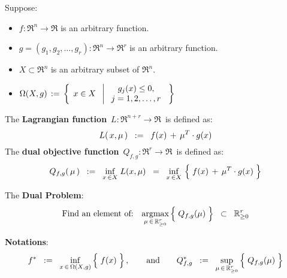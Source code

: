 \noindent
\begin{definition}
\mbox{}
\vskip 0.1cm
\noindent
Suppose:
\begin{itemize}
\item
	$f : \Re^{n} \longrightarrow \Re$ is an arbitrary function.
\item
	$g = (g_{1},g_{2},\ldots,g_{r}) : \Re^{n} \longrightarrow \Re^{r}$ is an arbitrary function.
\item
	$X \subset \Re^{n}$ is an arbitrary subset of $\Re^{n}$.
\item
	$\Omega(X,g) \, := \,
	\left\{\;\,
	x \overset{{\color{white}.}}{\in} X
	\;\;\left\vert\;
		\begin{array}{c}
			g_{j}(x) \leq 0,
			\\
			j = 1,2,\ldots,r
		\end{array}
		\right.
	\;\right\}$
\end{itemize}
The \textbf{Lagrangian function} \,$L : \Re^{n+r} \longrightarrow \Re$\, is defined as:
\begin{equation*}
L(\,x,\mu\,)
\;\; := \;\;
	f(x) \,\overset{{\color{white}.}}{+}\, \mu^{T}\cdot g(x)
\end{equation*}
The \textbf{dual objective function} \,$Q_{f,g} : \Re^{r} \longrightarrow \Re$\, is defined as:
\begin{equation*}
Q_{f,g}(\,\mu\,)
\;\; := \;\;
	\underset{x\,\in X}{\inf}\;L(x,\mu)
\;\; = \;\;
	\underset{x\,\in X}{\inf}\,\left\{\;f(x) \,\overset{{\color{white}.}}{+}\, \mu^{T}\cdot g(x)\;\right\}
\end{equation*}

\vskip 0.5cm
\noindent
The \textbf{Dual Problem}:
\begin{equation*}
\textnormal{Find an element of:}
\quad
	\underset{\mu\,\in\,\Re_{\geq 0}^{r}}{\argmax}\left\{\;
	\overset{{\color{white}.}}{Q_{f,g}(\mu)}
	\;\right\}
\;\; \subset \;\;
	\Re^{r}_{\geq 0}
\end{equation*}

\vskip 0.5cm
\noindent
\textbf{Notations}:
\begin{equation*}
f^{*}
\;\; := \;\;
	\underset{x\,\in\,\Omega(X,g)}{\inf}\left\{\;
		\overset{{\color{white}.}}{f(x)}
		\;\right\},
\quad\quad
\textnormal{and}
\quad\quad
Q_{f,g}^{*}
\;\; := \;\;
	\underset{\mu\,\in\,\Re_{\geq 0}^{r}}{\sup}\left\{\;
	\overset{{\color{white}.}}{Q_{f,g}(\mu)}
	\;\right\}
\end{equation*}
\end{definition}

